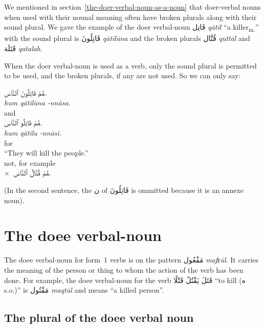 \documentclass[
  10pt,
]{book}
\begin{document}
We mentioned in section~\ref{the-doer-verbal-noun-as-a-noun} that doer-verbal nouns when used with their nounal meaning often have broken plurals along with their sound plural.
We gave the example of the doer verbal-noun
\foreignlanguage{arabic}{قَاتِل} \emph{qātil} \enquote{a killer\textsubscript{m.}} with the sound plural is \foreignlanguage{arabic}{قَاتِلُونَ} \emph{qātilūna} and the broken plurals \foreignlanguage{arabic}{قُتَّال} \emph{quttāl} and \foreignlanguage{arabic}{قَتَلَة} \emph{qatalah}.

When the doer verbal-noun is used as a verb, only the sound plural is permitted to be used, and the broken plurals, if any are not used. So we can only say:

\foreignlanguage{arabic}{هُمْ قَاتِلُونَ ٱلنَّاسَ.}\\
\emph{hum qātilūna -nnāsa.}\\
and\\
\foreignlanguage{arabic}{هُمْ قَاتِلُو ٱلنَّاسِ.}\\
\emph{hum qātilu -nnāsi.}\\
for\\
\enquote{They will kill the people.}\\
not, for example\\
\(\times\)~\foreignlanguage{arabic}{هُمْ قُتَّالٌ ٱلنَّاسَ.}

(In the second sentence, the \foreignlanguage{arabic}{ن} of \foreignlanguage{arabic}{قَاتِلُونَ} is ommitted because it is an annexe noun).

\section{The doee verbal-noun}\label{the-doee-verbal-noun}

The doee verbal-noun for form~1 verbs is on the pattern \foreignlanguage{arabic}{مَفْعُول} \emph{mafɛūl}. It carries the meaning of the person or thing to whom the action of the verb has been done. For example, the doee verbal-noun for the verb
\foreignlanguage{arabic}{قَتَلَ يَقْتُلُ قَتْلًا} \enquote{to kill (\foreignlanguage{arabic}{ه} s.o.)}
is \foreignlanguage{arabic}{مَقْتُول} \emph{maqtūl} and means \enquote{a killed person}.

\subsection{The plural of the doee verbal noun}\label{the-plural-of-the-doee-verbal-noun}
\end{document}
